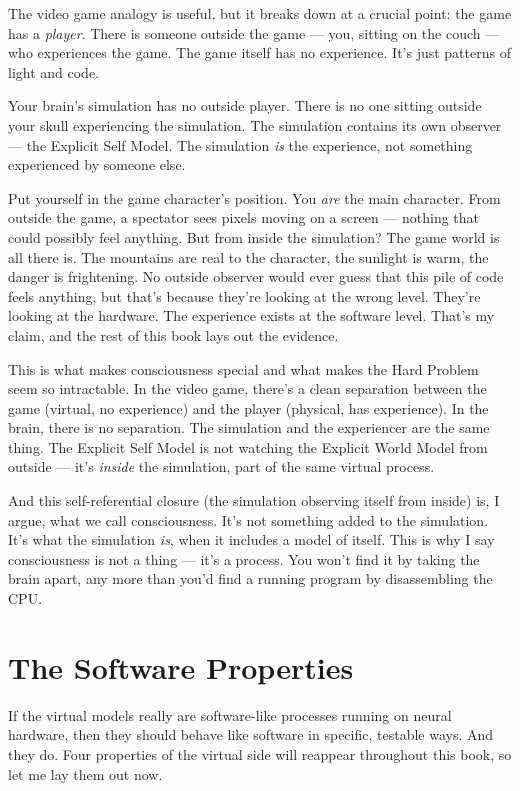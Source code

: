 \documentclass[11pt, twoside, openright]{book}
\begin{document}
The video game analogy is useful, but it breaks down at a crucial point: the game has a \textit{player}. There is someone outside the game --- you, sitting on the couch --- who experiences the game. The game itself has no experience. It's just patterns of light and code.

Your brain's simulation has no outside player. There is no one sitting outside your skull experiencing the simulation. The simulation contains its own observer --- the Explicit Self Model. The simulation \textit{is} the experience, not something experienced by someone else.

Put yourself in the game character's position. You \textit{are} the main character. From outside the game, a spectator sees pixels moving on a screen --- nothing that could possibly feel anything. But from inside the simulation? The game world is all there is. The mountains are real to the character, the sunlight is warm, the danger is frightening. No outside observer would ever guess that this pile of code feels anything, but that's because they're looking at the wrong level. They're looking at the hardware. The experience exists at the software level. That's my claim, and the rest of this book lays out the evidence.

This is what makes consciousness special and what makes the Hard Problem seem so intractable. In the video game, there's a clean separation between the game (virtual, no experience) and the player (physical, has experience). In the brain, there is no separation. The simulation and the experiencer are the same thing. The Explicit Self Model is not watching the Explicit World Model from outside --- it's \textit{inside} the simulation, part of the same virtual process.

And this self-referential closure (the simulation observing itself from inside) is, I argue, what we call consciousness. It's not something added to the simulation. It's what the simulation \textit{is}, when it includes a model of itself. This is why I say consciousness is not a thing --- it's a process. You won't find it by taking the brain apart, any more than you'd find a running program by disassembling the CPU.

\section*{The Software Properties}

If the virtual models really are software-like processes running on neural hardware, then they should behave like software in specific, testable ways. And they do. Four properties of the virtual side will reappear throughout this book, so let me lay them out now.
\end{document}
